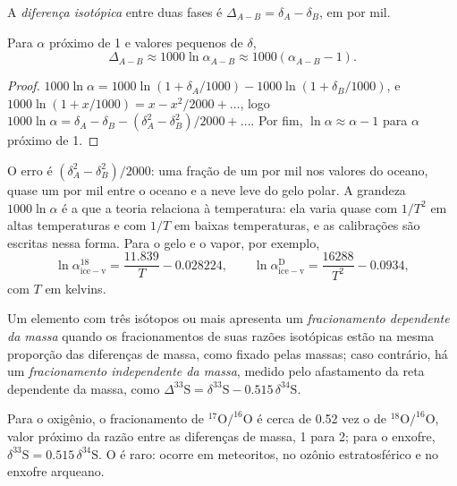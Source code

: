 \begin{definition}\label{def:b3:stable-isotopes:big-delta}
A \emph{diferença isotópica}
entre duas fases é $\Delta_{A-B} = \delta_A - \delta_B$, em por mil.
\end{definition}

\begin{proposition}
\label{prop:b3:stable-isotopes:big-delta}
Para $\alpha$ próximo de 1 e valores pequenos de $\delta$,
\[
\Delta_{A-B} \approx 1000\ln\alpha_{A-B} \approx 1000(\alpha_{A-B} - 1).
\]
\end{proposition}

\begin{proof}
$1000\ln\alpha = 1000\ln(1 + \delta_A/1000) - 1000\ln(1 + \delta_B/1000)$, e
$1000\ln(1 + x/1000) = x - x^2/2000 + \dots$, logo $1000\ln\alpha = \delta_A -
\delta_B - (\delta_A^2 - \delta_B^2)/2000 + \dots$. Por fim, $\ln\alpha \approx
\alpha - 1$ para $\alpha$ próximo de 1.
\end{proof}

O erro é $(\delta_A^2 - \delta_B^2)/2000$: uma fração de um por mil nos
valores do oceano, quase um por mil entre o oceano e a neve leve do
gelo polar.
A grandeza $1000\ln\alpha$ é a que a teoria relaciona à temperatura: ela
varia quase com $1/T^2$ em altas temperaturas e com $1/T$ em baixas temperaturas,
e as calibrações são escritas nessa forma. Para o gelo e o vapor, por exemplo,
\[
\ln\alpha^{18}_{\mathrm{ice-v}} = \frac{11.839}{T} - 0.028224, \qquad
\ln\alpha^{\mathrm D}_{\mathrm{ice-v}} = \frac{16288}{T^2} - 0.0934,
\]
com $T$ em kelvins.

\begin{definition}\label{def:b3:stable-isotopes:mif}
Um elemento com três isótopos ou mais apresenta um \emph{fracionamento
dependente da massa} quando os fracionamentos de
suas razões isotópicas estão na mesma proporção das diferenças de massa, como fixado pelas
massas; caso contrário, há um \emph{fracionamento independente
da massa}, medido pelo afastamento
da reta dependente da massa, como $\Delta^{33}\mathrm S = \delta^{33}\mathrm S
- 0.515\,\delta^{34}\mathrm S$.
\end{definition}

Para o oxigênio, o fracionamento de $^{17}\mathrm O/^{16}\mathrm O$ é cerca de 0.52 vez
o de $^{18}\mathrm O/^{16}\mathrm O$, valor próximo da razão entre as diferenças de massa, 1 para 2;
para o enxofre, $\delta^{33}\mathrm S = 0.515\,\delta^{34}\mathrm S$. O  é raro: ocorre em meteoritos, no ozônio estratosférico e
no enxofre arqueano.

